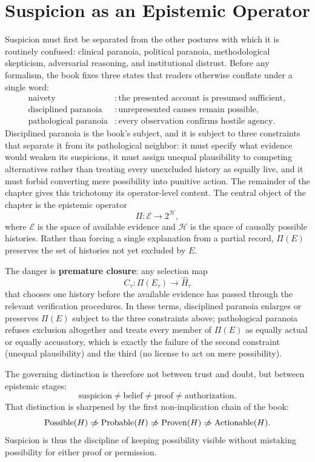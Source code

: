 
\chapter{Suspicion as an Epistemic Operator}
\label{ch:ch001}


Suspicion must first be separated from the other postures with which it is routinely confused: clinical paranoia, political paranoia, methodological skepticism, adversarial reasoning, and institutional distrust. Before any formalism, the book fixes three states that readers otherwise conflate under a single word:
\[
\begin{aligned}
\text{naivety} &: \text{the presented account is presumed sufficient},\\
\text{disciplined paranoia} &: \text{unrepresented causes remain possible},\\
\text{pathological paranoia} &: \text{every observation confirms hostile agency}.
\end{aligned}
\]
Disciplined paranoia is the book's subject, and it is subject to three constraints that separate it from its pathological neighbor: it must specify what evidence would weaken its suspicions, it must assign unequal plausibility to competing alternatives rather than treating every unexcluded history as equally live, and it must forbid converting mere possibility into punitive action. The remainder of the chapter gives this trichotomy its operator-level content. The central object of the chapter is the epistemic operator
\[
\Pi:\mathcal E\longrightarrow 2^{\mathcal H},
\]
where \(\mathcal E\) is the space of available evidence and \(\mathcal H\) is the space of causally possible histories. Rather than forcing a single explanation from a partial record, \(\Pi(E)\) preserves the set of histories not yet excluded by \(E\).

The danger is \textbf{premature closure}: any selection map
\[
C_\tau:\Pi(E_\tau)\longrightarrow \widehat H_\tau
\]
that chooses one history before the available evidence has passed through the relevant verification procedures. In these terms, disciplined paranoia enlarges or preserves \(\Pi(E)\) subject to the three constraints above; pathological paranoia refuses exclusion altogether and treats every member of \(\Pi(E)\) as equally actual or equally accusatory, which is exactly the failure of the second constraint (unequal plausibility) and the third (no license to act on mere possibility).

The governing distinction is therefore not between trust and doubt, but between epistemic stages:
\[
\text{suspicion}\neq\text{belief}\neq\text{proof}\neq\text{authorization}.
\]
That distinction is sharpened by the first non-implication chain of the book:
\[
\operatorname{Possible}(H)
\centernot\Rightarrow
\operatorname{Probable}(H)
\centernot\Rightarrow
\operatorname{Proven}(H)
\centernot\Rightarrow
\operatorname{Actionable}(H).
\]
Suspicion is thus the discipline of keeping possibility visible without mistaking possibility for either proof or permission.

